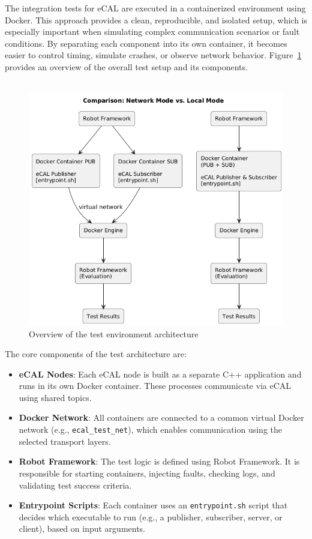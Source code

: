 The integration tests for eCAL are executed in a containerized environment using Docker. This approach provides a clean, reproducible, and isolated setup, which is especially important when simulating complex communication scenarios or fault conditions. By separating each component into its own container, it becomes easier to control timing, simulate crashes, or observe network behavior. Figure~\ref{fig:test_architecture_diagram} provides an overview of the overall test setup and its components.
 \\
 \\
 
 \begin{figure}[H]
 	\centering
 	\includegraphics[width=1.0\textwidth]{Images/test_architecture_diagram2.png}
 	\caption{Overview of the test environment architecture}
 	\label{fig:test_architecture_diagram}
 \end{figure}
 
The core components of the test architecture are:

\begin{itemize}
	\item \textbf{eCAL Nodes}: Each eCAL node is built as a separate C++ application and runs in its own Docker container. These processes communicate via eCAL using shared topics.
	\item \textbf{Docker Network}: All containers are connected to a common virtual Docker network (e.g., \texttt{ecal\_test\_net}), which enables communication using the selected transport layers.
	\item \textbf{Robot Framework}: The test logic is defined using Robot Framework. It is responsible for starting containers, injecting faults, checking logs, and validating test success criteria.
	\item \textbf{Entrypoint Scripts}: Each container uses an \texttt{entrypoint.sh} script that decides which executable to run (e.g., a publisher, subscriber, server, or client), based on input arguments.
\end{itemize}

